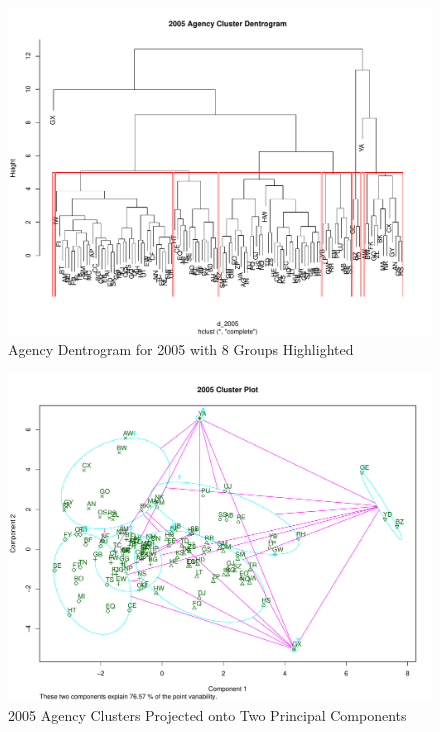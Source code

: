 \documentclass{article}
\begin{document}
    \begin{center}
        \begin{figure}
            \includegraphics[scale=0.4]{./images/2005-dentrogram.pdf}
            \caption{Agency Dentrogram for 2005 with 8 Groups Highlighted}
            \label{fig:4}
        \end{figure}
    \end{center}

    \begin{center}
        \begin{figure}
            \includegraphics[scale=0.4]{./images/2005-cluster-plot.pdf}
            \caption{2005 Agency Clusters Projected onto Two Principal Components}
            \label{fig:5}
        \end{figure}
    \end{center}
\end{document}
